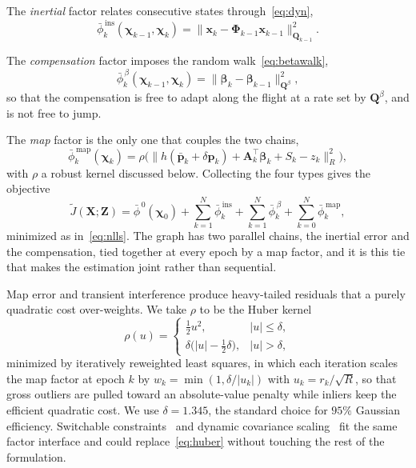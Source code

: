The \emph{inertial} factor relates consecutive states through~\eqref{eq:dyn},
\begin{equation}
\bar{\phi}^{\,\mathrm{ins}}_k(\boldsymbol{\chi}_{k-1},\boldsymbol{\chi}_k)=
\big\lVert\mathbf{x}_k-\boldsymbol{\Phi}_{k-1}\mathbf{x}_{k-1}\big\rVert^{2}_{\mathbf{Q}_{k-1}} .
\label{eq:fins}
\end{equation}

The \emph{compensation} factor imposes the random walk~\eqref{eq:betawalk},
\begin{equation}
\bar{\phi}^{\,\beta}_k(\boldsymbol{\chi}_{k-1},\boldsymbol{\chi}_k)=
\big\lVert\boldsymbol{\beta}_k-\boldsymbol{\beta}_{k-1}\big\rVert^{2}_{\mathbf{Q}^{\beta}} ,
\label{eq:fbeta}
\end{equation}
so that the compensation is free to adapt along the flight at a rate set by
$\mathbf{Q}^{\beta}$, and is not free to jump.

The \emph{map} factor is the only one that couples the two chains,
\begin{equation}
\bar{\phi}^{\,\mathrm{map}}_k(\boldsymbol{\chi}_k)=
\rho\!\Big(\big\lVert h(\bar{\mathbf{p}}_k+\delta\mathbf{p}_k)
+\mathbf{A}_k^{\top}\boldsymbol{\beta}_k+S_k-z_k\big\rVert^{2}_{R}\Big),
\label{eq:fmap}
\end{equation}
with $\rho$ a robust kernel discussed below. Collecting the four types gives the
objective
\begin{equation}
\tilde{J}(\mathbf{X};\mathbf{Z})=\bar{\phi}^{\,0}(\boldsymbol{\chi}_0)
+\sum_{k=1}^{N}\bar{\phi}^{\,\mathrm{ins}}_k
+\sum_{k=1}^{N}\bar{\phi}^{\,\beta}_k
+\sum_{k=0}^{N}\bar{\phi}^{\,\mathrm{map}}_k ,
\label{eq:objective}
\end{equation}
minimized as in~\eqref{eq:nlls}. The graph has two parallel chains, the inertial
error and the compensation, tied together at every epoch by a map factor, and it
is this tie that makes the estimation joint rather than sequential.

Map error and transient interference produce heavy-tailed residuals that a
purely quadratic cost over-weights. We take $\rho$ to be the Huber
kernel~\cite{huber1964}
\begin{equation}
\rho(u)=\begin{cases}\tfrac12 u^2,& |u|\le\delta,\\
\delta\big(|u|-\tfrac12\delta\big),& |u|>\delta,\end{cases}
\label{eq:huber}
\end{equation}
minimized by iteratively reweighted least squares, in which each iteration
scales the map factor at epoch $k$ by $w_k=\min(1,\delta/|u_k|)$ with
$u_k=r_k/\sqrt{R}$, so that gross outliers are pulled toward an absolute-value
penalty while inliers keep the efficient quadratic cost. We use
$\delta=1.345$, the standard choice for $95\%$ Gaussian efficiency. Switchable
constraints~\cite{sunderhauf2012} and dynamic covariance
scaling~\cite{agarwal2013} fit the same factor interface and could
replace~\eqref{eq:huber} without touching the rest of the formulation.

